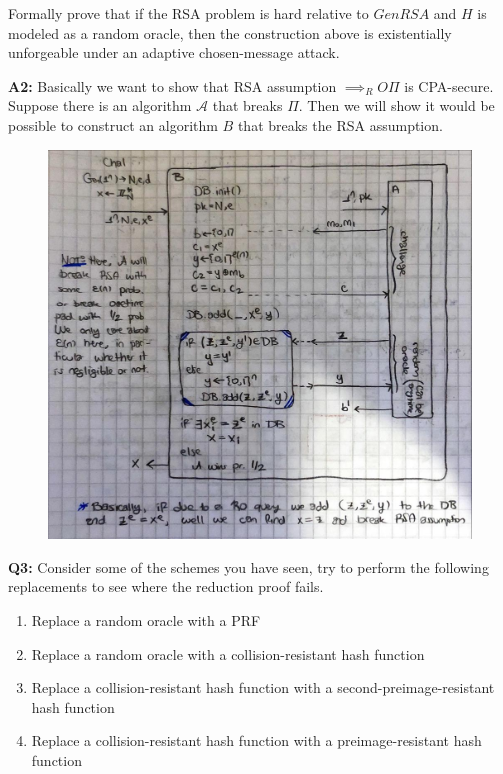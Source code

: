 \documentclass[12pt,reqno]{amsart}
\newcommand{\advrs}[0]{\mathcal{A}}
\begin{document}
Formally prove that if the RSA problem is hard relative to $GenRSA$ and $H$ is modeled as a random oracle, then the construction above is existentially unforgeable under an adaptive chosen-message attack.

\textbf{A2:} Basically we want to show that RSA assumption $\implies_RO \Pi$ is CPA-secure. Suppose there is an algorithm $\advrs$ that breaks $\Pi$. Then we will show it would be possible to construct an algorithm $B$ that breaks the RSA assumption.

\begin{figure}[ht]
 	\includegraphics[width=0.9\linewidth]{rsaoracle.jpeg}
\end{figure}


\newpage
\textbf{Q3:} Consider some of the schemes you have seen, try to perform the following replacements to see where the reduction proof fails.
\begin{enumerate}
	\item Replace a random oracle with a PRF
	\item Replace a random oracle with a collision-resistant hash function
	\item Replace a collision-resistant hash function with a second-preimage-resistant hash function
	\item Replace a collision-resistant hash function with a preimage-resistant hash function
\end{enumerate}  
\end{document}
